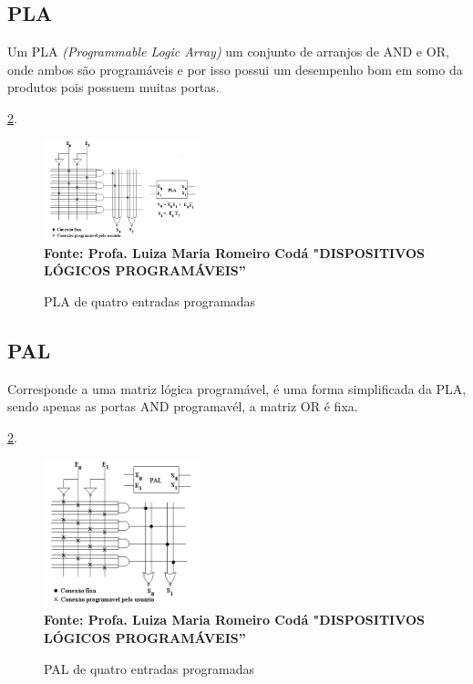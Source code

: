 \subsection{\esp PLA}

Um PLA \textit{(Programmable Logic Array)} um conjunto de arranjos de AND e OR, onde ambos são programáveis e por isso possui um desempenho bom em somo da produtos pois possuem muitas portas.

 \ref{fig:figura1}. 
\begin{figure}[ht]
	\centering	
	\caption[\hspace{0.1cm}]{PLA de quatro entradas programadas}
  \includegraphics[width=0.4\textwidth]{figuras/pla.png}
	 \vspace{-0.2cm}
	\\\textbf{\footnotesize Fonte: Profa. Luiza Maria Romeiro Codá "DISPOSITIVOS LÓGICOS PROGRAMÁVEIS”}
	\label{fig:figura1}
\end{figure}
\vspace{-0.5cm}


\subsection{\esp PAL}

Corresponde a uma matriz lógica programável, é uma forma simplificada da PLA, sendo apenas as portas AND programavél, a matriz OR é fixa.

 \ref{fig:figura1}. 
\begin{figure}[ht]
	\centering	
	\caption[\hspace{0.1cm}]{PAL de quatro entradas programadas}
\includegraphics[width=0.4\textwidth]{figuras/PAL.png}
	 \vspace{-0.2cm}
	\\\textbf{\footnotesize Fonte: Profa. Luiza Maria Romeiro Codá "DISPOSITIVOS LÓGICOS PROGRAMÁVEIS”}
	\label{fig:figura1}
\end{figure}
\vspace{-0.5cm}


